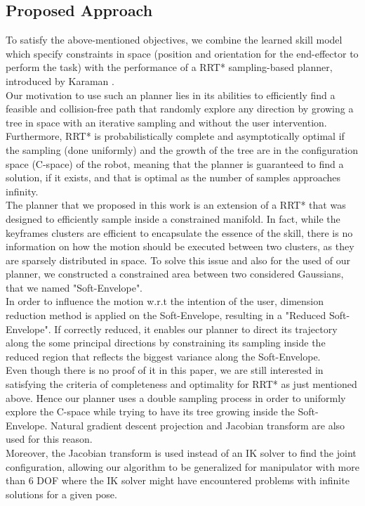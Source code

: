 \documentclass[letterpaper, 10 pt, conference]{ieeeconf}  %
\begin{document}
 \subsection{Proposed Approach}
To satisfy the above-mentioned objectives, we combine the learned skill model which specify constraints in space (position and orientation for the end-effector to perform the task) with the performance of a RRT* sampling-based planner, introduced by Karaman \cite{KaramanRRTStar}.\\
Our motivation to use such an planner lies in its abilities to efficiently find a feasible and collision-free path that randomly explore any direction by growing a tree in space with an iterative sampling and without the user intervention. Furthermore, RRT* is probabilistically complete and asymptotically optimal if the sampling (done uniformly) and the growth of the tree are in the configuration space (C-space) of the robot, meaning that the planner is guaranteed to find a solution, if it exists, and that is optimal as the number of samples approaches infinity.\\
The planner that we proposed in this work is an extension of a RRT* that was designed to efficiently sample inside a constrained manifold. In fact, while the keyframes clusters are efficient to encapsulate the essence of the skill, there is no information on how the motion should be executed between two clusters, as they are sparsely distributed in space. To solve this issue and also for the used of our planner, we constructed a constrained area between two considered Gaussians, that we named "Soft-Envelope".\\
In order to influence the motion w.r.t the intention of the user, dimension reduction method is applied on the Soft-Envelope, resulting in a "Reduced Soft-Envelope". If correctly reduced, it enables our planner to direct its trajectory along the some principal directions by constraining its sampling inside the reduced region that reflects  the biggest variance along the Soft-Envelope.\\
Even though there is no proof of it in this paper, we are still interested in satisfying the criteria of completeness and optimality for RRT* as just mentioned above. Hence our planner uses a double sampling process in order to uniformly explore the C-space while trying to have its tree growing inside the Soft-Envelope. Natural gradient descent projection and Jacobian transform are also used for this reason.\\
Moreover, the Jacobian transform is used instead of an IK solver to find the joint configuration, allowing our algorithm to be generalized for manipulator with more than 6 DOF where the IK solver might have  encountered problems with infinite solutions for a given pose.
\end{document}
